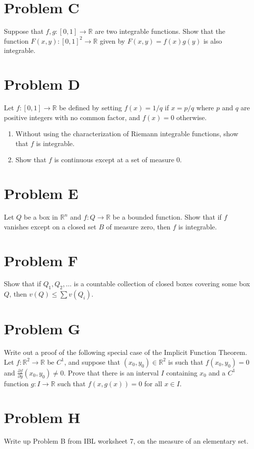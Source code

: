 \documentclass[lang=cn,11pt]{template}
\begin{document}
\section*{Problem C}
Suppose that $f, g : [0, 1] \to \mathbb{R}$ are two integrable functions. Show that the function $F (x, y) : [0, 1]^2 \to \mathbb{R}$ given by $F (x, y) = f(x)g(y)$ is also integrable.

\section*{Problem D}
Let $f : [0, 1] \to \mathbb{R}$ be defined by setting $f(x) = 1/q$ if $x = p/q$ where $p$ and $q$ are positive integers with no common factor, and $f(x) = 0$ otherwise.
\begin{enumerate}
    \item Without using the characterization of Riemann integrable functions, show that $f$ is integrable.
    \item Show that $f$ is continuous except at a set of measure 0.
\end{enumerate}

\section*{Problem E}
Let $Q$ be a box in $\mathbb{R}^n$ and $f : Q \to \mathbb{R}$ be a bounded function. Show that if $f$ vanishes except on a closed set $B$ of measure zero, then $f$ is integrable.

\section*{Problem F}
Show that if $Q_1, Q_2, \dots$ is a countable collection of closed boxes covering some box $Q$, then $v(Q) \leq \sum v(Q_i)$.


\section*{Problem G}
Write out a proof of the following special case of the Implicit Function Theorem. Let $f : \mathbb{R}^2 \to \mathbb{R}$ be $C^1$, and suppose that $(x_0, y_0) \in \mathbb{R}^2$ is such that $f(x_0, y_0) = 0$ and $\frac{\partial f}{\partial y}(x_0, y_0) \neq 0$. Prove that there is an interval $I$ containing $x_0$ and a $C^1$ function $g : I \to \mathbb{R}$ such that $f(x, g(x)) = 0$ for all $x \in I$.

\section*{Problem H}
Write up Problem B from IBL worksheet 7, on the measure of an elementary set.
\end{document}
